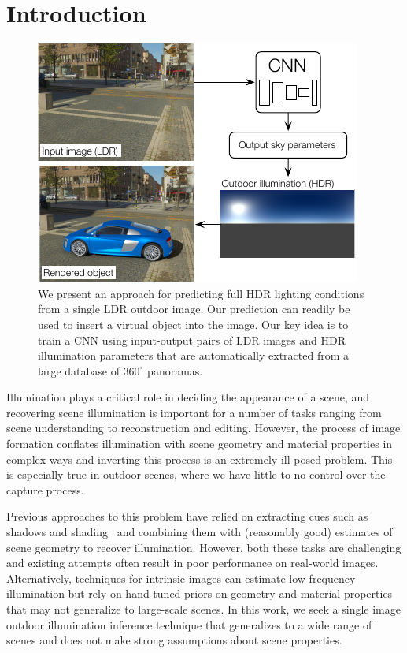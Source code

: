 \section{Introduction}

\begin{figure}
\centering
\includegraphics[width=\linewidth]{figures/teaser/teaser-skymodel.pdf}
\caption[Presentation of the proposed method]{We present an approach for predicting full HDR lighting conditions from a single LDR outdoor image. Our prediction can readily be used to insert a virtual object into the image. Our key idea is to train a CNN using input-output pairs of LDR images and HDR illumination parameters that are automatically extracted from a large database of $360^\circ$ panoramas.}
\label{fig:teaser}
\vspace{-1em}
\end{figure}

Illumination plays a critical role in deciding the appearance of a scene, and recovering scene illumination is important for a number of tasks ranging from scene understanding to reconstruction and editing. However, the process of image formation conflates illumination with scene geometry and material properties in complex ways and inverting this process is an extremely ill-posed problem. This is especially true in outdoor scenes, where we have little to no control over the capture process.

Previous approaches to this problem have relied on extracting cues such as shadows and shading~\cite{lalonde-ijcv-12} and combining them with (reasonably good) estimates of scene geometry to recover illumination. However, both these tasks are challenging and existing attempts often result in poor performance on real-world images. Alternatively, techniques for intrinsic images can estimate low-frequency illumination but rely on hand-tuned priors on geometry and material properties~\cite{barron-pami-15,lombardi2016reflectance} that may not generalize to large-scale scenes. In this work, we seek a single image outdoor illumination inference technique that generalizes to a wide range of scenes and does not make strong assumptions about scene properties.

